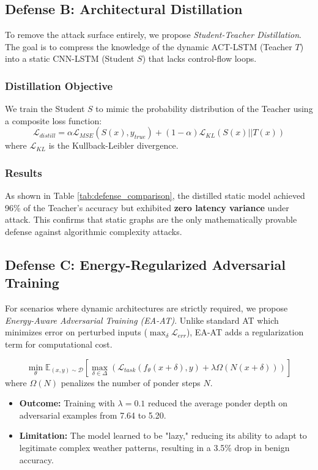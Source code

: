 \subsection{Defense B: Architectural Distillation}
To remove the attack surface entirely, we propose \textit{Student-Teacher Distillation}. The goal is to compress the knowledge of the dynamic ACT-LSTM (Teacher $T$) into a static CNN-LSTM (Student $S$) that lacks control-flow loops.

\subsubsection{Distillation Objective}
We train the Student $S$ to mimic the probability distribution of the Teacher using a composite loss function:
\begin{equation}
    \mathcal{L}_{distill} = \alpha \mathcal{L}_{MSE}(S(x), y_{true}) + (1-\alpha) \mathcal{L}_{KL}(S(x) || T(x))
\end{equation}
where $\mathcal{L}_{KL}$ is the Kullback-Leibler divergence.

\subsubsection{Results}
As shown in Table \ref{tab:defense_comparison}, the distilled static model achieved 96\% of the Teacher's accuracy but exhibited \textbf{zero latency variance} under attack. This confirms that static graphs are the only mathematically provable defense against algorithmic complexity attacks.

\subsection{Defense C: Energy-Regularized Adversarial Training}
For scenarios where dynamic architectures are strictly required, we propose \textit{Energy-Aware Adversarial Training (EA-AT)}. Unlike standard AT which minimizes error on perturbed inputs ($\max_\delta \mathcal{L}_{err}$), EA-AT adds a regularization term for computational cost.

\begin{equation}
    \min_\theta \mathbb{E}_{(x,y) \sim \mathcal{D}} \left[ \max_{\delta \in \Delta} \left( \mathcal{L}_{task}(f_\theta(x+\delta), y) + \lambda \Omega(N(x+\delta)) \right) \right]
\end{equation}
where $\Omega(N)$ penalizes the number of ponder steps $N$.
\begin{itemize}
    \item \textbf{Outcome:} Training with $\lambda=0.1$ reduced the average ponder depth on adversarial examples from 7.64 to 5.20.
    \item \textbf{Limitation:} The model learned to be "lazy," reducing its ability to adapt to legitimate complex weather patterns, resulting in a 3.5\% drop in benign accuracy.
\end{itemize}

